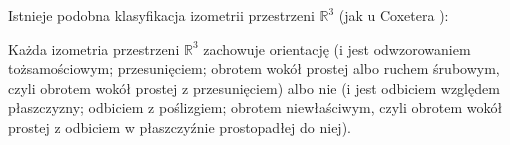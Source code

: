 Istnieje podobna klasyfikacja izometrii przestrzeni $\mathbb R^3$ (jak u Coxetera \cite[s. 113-122]{coxeter_1967}):

\begin{proposition}
        Każda izometria przestrzeni $\mathbb R^3$ zachowuje orientację (i jest odwzorowaniem tożsamościowym; przesunięciem; obrotem wokół prostej albo ruchem śrubowym, czyli obrotem wokół prostej z przesunięciem) albo nie (i jest odbiciem względem płaszczyzny; odbiciem z poślizgiem; obrotem niewłaściwym, czyli obrotem wokół prostej z odbiciem w płaszczyźnie prostopadłej do niej).
\end{proposition}

%